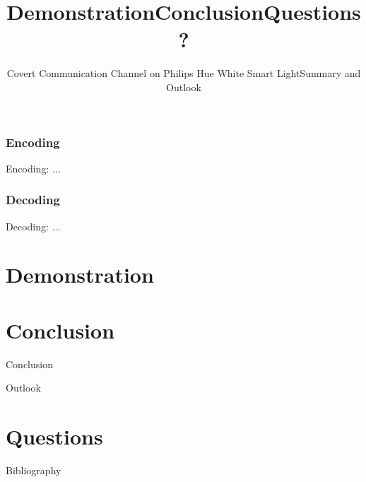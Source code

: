 \documentclass[11pt,t,usepdftitle=false,aspectratio=169]{beamer}
\begin{document}
\subsubsection{Encoding} %
\label{subsub:encoding}
\begin{frame}{Encoding: ...}
     
\end{frame}

\subsubsection{Decoding} %
\label{subsub:decoding}
\begin{frame}{Decoding: ...}
 
\end{frame}

\section{Demonstration} %
\label{sec:demonstration}
\title{Demonstration}
\subtitle{Covert Communication Channel on Philips Hue White Smart Light}

\section{Conclusion} %
\label{sec:conclusion}
\title{Conclusion}
\subtitle{Summary and Outlook}
\begin{frame}{Conclusion} %

\end{frame}

\begin{frame}{Outlook} %

\end{frame}



\title{Questions?}
\subtitle{}
\section{Questions}


\appendix

\begin{frame}[allowframebreaks]{Bibliography}
	
	
\end{frame}
\end{document}
